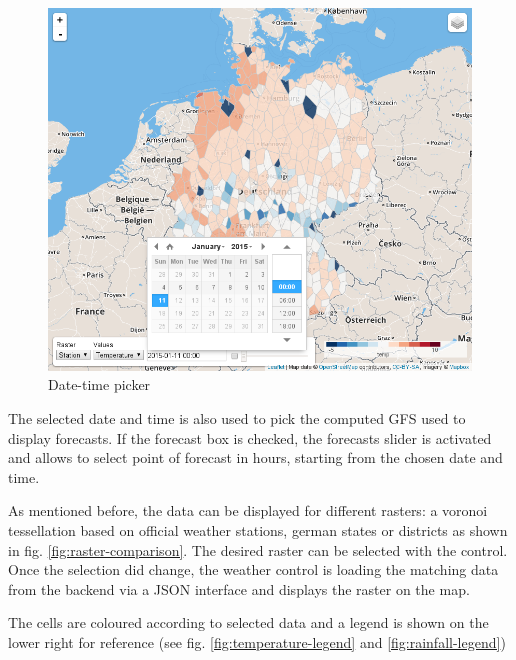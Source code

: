 \documentclass[paper=a4, fontsize=11pt]{article} %
\numberwithin{equation}{section} %
\numberwithin{figure}{section} %
\numberwithin{table}{section} %
\begin{document}
\begin{figure}[htbp]
\centering
\includegraphics[width=1\textwidth]{pictures/screenshot-control-datetime.png}
\caption{Date-time picker}
\label{fig:date-time-picker}
\end{figure}

The selected date and time is also used to pick the computed GFS used to
display forecasts. If the forecast box is checked, the forecasts slider
is activated and allows to select point of forecast in hours, starting
from the chosen date and time.

As mentioned before, the data can be displayed for different rasters: a
voronoi tessellation based on official weather stations, german states or
districts as shown in fig. \ref{fig:raster-comparison}. The desired raster can be selected with the control. Once the
selection did change, the weather control is loading the matching data
from the backend via a JSON interface and displays the raster on the
map.

The cells are coloured according to selected data and a legend is shown
on the lower right for reference (see fig. \ref{fig:temperature-legend} and \ref{fig:rainfall-legend})
\end{document}
